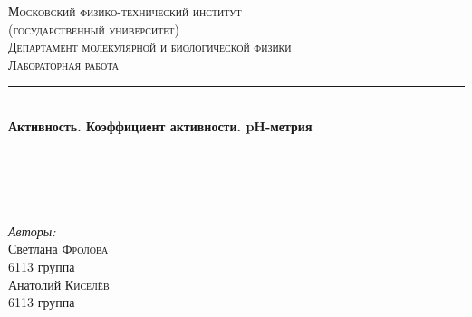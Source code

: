\documentclass[a4paper, 12pt]{article}
\begin{document}
\begin{titlepage}

\newcommand{\HRule}{\rule{\linewidth}{0.5mm}} %

\center %
 

\textsc{\LARGE Московский физико-технический институт\\(государственный университет)}\\[1,5cm] %
\textsc{\Large Департамент молекулярной и биологической физики}\\[2cm] %
\textsc{\large Лабораторная работа}\\[0.5cm] %


\HRule
\\[0.4cm]
{ \huge \bfseries Активность. Коэффициент активности. pH-метрия}
\\[0.2cm] %
\HRule
\\[1.5cm]


 
\begin{minipage}{0.4\textwidth}
	\begin{flushleft}		
	\end{flushleft}
\end{minipage}
~
\begin{minipage}{0.4\textwidth}
	\begin{flushright} \large
		\emph{Авторы:}\\
		Светлана \textsc{Фролова} \\
		6113 группа \\
		Анатолий \textsc{Киселёв} \\
		6113 группа
	\end{flushright}
\end{minipage}



\end{titlepage}
\end{document}
